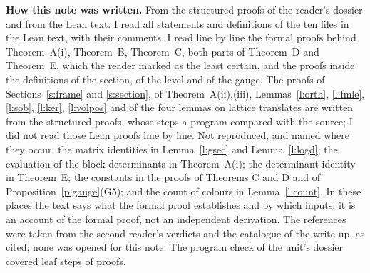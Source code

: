 \documentclass[11pt,a4paper]{article}
\newcommand{\subhead}[1]{\par\addvspace{9pt plus 2pt}\Needspace{4\baselineskip}\noindent\textbf{#1}\enspace\ignorespaces}
\theoremstyle{plainx}
\theoremstyle{uprightx}
\begin{document}
\subhead{How this note was written.} From the structured proofs of the reader's dossier and from the Lean text. I
read all statements and definitions of the ten files in the Lean text, with their comments. I read line by line the
formal proofs behind Theorem~A(i), Theorem~B, Theorem~C, both parts of Theorem~D and Theorem~E, which the reader
marked as the least certain, and the proofs inside the definitions of the section, of the level and of the gauge.
The proofs of Sections~\ref{s:frame} and \ref{s:section}, of Theorem~A(ii),(iii), Lemmas~\ref{l:orth},
\ref{l:fmle}, \ref{l:sob}, \ref{l:ker}, \ref{l:volpos} and of the four lemmas on lattice translates are written
from the structured proofs, whose steps a program compared with the source; I did not read those Lean proofs line
by line. Not reproduced, and named where they occur: the matrix identities in Lemma~\ref{l:gsec} and
Lemma~\ref{l:logd}; the evaluation of the block determinants in Theorem~A(i); the determinant identity in
Theorem~E; the constants in the proofs of Theorems C and D and of Proposition~\ref{p:gauge}(G5); and the count of
colours in Lemma~\ref{l:count}. In these places the text says what the formal proof establishes and by which
inputs; it is an account of the formal proof, not an independent derivation. The references were taken from the
second reader's verdicts and the catalogue of the write-up, as cited; none was opened for this note. The program
check of the unit's dossier covered \UnitSteps{} leaf steps of \UnitProofs{} proofs.
\end{document}
